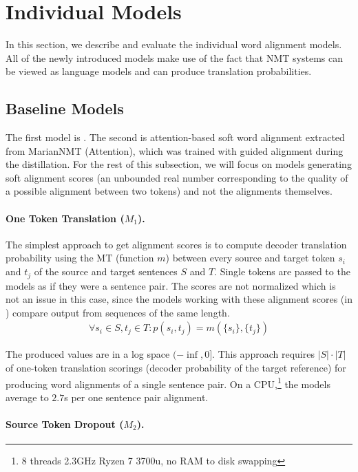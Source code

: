 \section{Individual Models} \label{sec:individual}

In this section, we describe and evaluate the individual word alignment models. All of the newly introduced models make use of the fact that NMT systems can be viewed as language models and can produce translation probabilities.

\subsection{Baseline Models} \label{subsec:baseline_models}

The first model is \fastalign{}. The second is attention-based soft word alignment extracted from MarianNMT (Attention), which was trained with guided alignment during the distillation. For the rest of this subsection, we will focus on models generating soft alignment scores (an unbounded real number corresponding to the quality of a possible alignment between two tokens) and not the alignments themselves.

\paragraph{One Token Translation ($M_1$).}

The simplest approach to get alignment scores is to compute decoder translation probability using the MT (function $m$) between every source and target token $s_i$ and $t_j$ of the source and target sentences $S$ and $T$. Single tokens are passed to the models as if they were a sentence pair. The scores are not normalized which is not an issue in this case, since the models working with these alignment scores (in ) compare output from sequences of the same length.
\begin{gather*}
\forall s_i\in S, t_j \in T: p(s_i, t_j) = m(\{s_i\}, \{t_j\})
\end{gather*}

The produced values are in a log space $(-\inf, 0]$. This approach requires $|S|\cdot |T|$ of one-token translation scorings (decoder probability of the target reference) for producing word alignments of a single sentence pair. On a CPU,\footnote{8 threads 2.3GHz Ryzen 7 3700u, no RAM to disk swapping} the models average to $2.7$s per one sentence pair alignment.

\paragraph{Source Token Dropout ($M_2$).}

